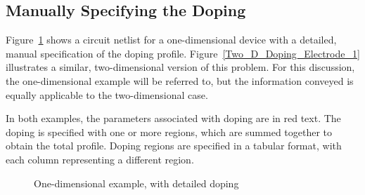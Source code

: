 \subsection{Manually Specifying the Doping} \label{Manual_Doping}
Figure~\ref{One_D_Doping_Electrode_1} shows a circuit netlist for a one-dimensional device with 
a detailed, manual specification of the doping
profile.  Figure~\ref{Two_D_Doping_Electrode_1} illustrates a similar, two-dimensional version of this problem. For this
discussion, the one-dimensional example will be referred to, but the information conveyed is equally applicable to the two-dimensional case.

In both examples, the parameters associated with doping are in red text.  The doping is specified with one or
more regions, which are summed together to obtain the total profile.  Doping regions are specified in a tabular format, with each column
representing a different region.  

\begin{figure}
  \begin{centering}
\caption{One-dimensional example, with detailed doping
\label{One_D_Doping_Electrode_1}}
\end{centering}
\end{figure}


